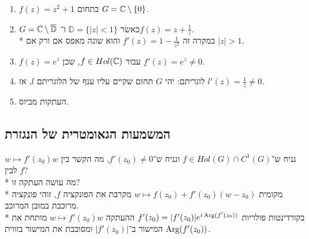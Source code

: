 \begin{example}
	\begin{enumerate}
		\item $f(z) = z^2 + 1$ בתחום $G = \mathbb{C} \setminus \{ 0 \}$.
		\item $G = \mathbb{C} \setminus \overline{\mathbb{D}}$ כאשר $\mathbb{D} = \{|z| < 1\}$ ו־$f(z) = z + \frac{1}{z}$. \\*
			במקרה זה $f'(z) = 1 - \frac{1}{z^2}$ והוא שונה מאפס אם ורק אם $|z| > 1$.
		\item $f(z) = e^z$ עבור $f \in Hol(\mathbb{C})$, שכן $f'(z) = e^z \ne 0$.
		\item לוגריתם: יהי $G$ תחום שקיים עליו ענף של הלוגריתם $l$, אז $l'(z) = \frac{1}{z} \ne 0$.
		\item העתקות מביוס.
	\end{enumerate}
\end{example}

\subsection{המשמעות הגאומטרית של הנגזרת}
נניח ש־$f \in Hol(G) \cap C^1(G)$ ונניח ש־$f'(z_0) \ne 0$, מה הקשר בין $w \mapsto f'(z_0) w$ לבין $f$? \\*
מה עושה העתקה זו? \\*
מקומית $w \mapsto f(z_0) + f'(z_0)(w - z_0)$ מקרבת את הפונקציה $f$, זוהי פונקציה מרוכבת במובן המרוכב. \\*
בקורדינטות פולריות $f'(z_0) = |f'(z_0)| e^{i \operatorname{Arg}(f'(z_0))}$ ההעתקה $w \mapsto f'(z_0) w$ מותחת את המישור ב־$|f'(z_0)|$ ומסובבת את המישור בזווית $\operatorname{Arg}(f'(z_0))$.

